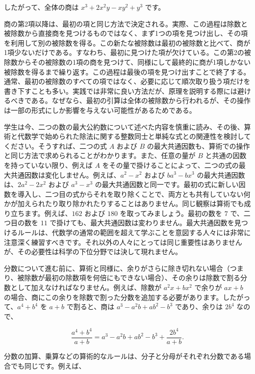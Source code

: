 \documentclass[a4paper,11pt,openany]{ltjsbook}
\begin{document}
したがって、全体の商は \(x^{3} + 2x^{2} y - xy^{2} + y^{3}\) です。

商の第2項以降は、最初の項と同じ方法で決定される。実際、この過程は除数と被除数から直接商を見つけるものではなく、まず1つの項を見つけ出し、その項を利用して別の被除数を得る。この新たな被除数は最初の被除数と比べて、商が1項少ないだけである。すなわち、最初に見つけた項が欠けている。この第2の被除数からその被除数の1項の商を見つけて、同様にして最終的に商が1項しかない被除数を得るまで繰り返す。この過程は最後の項を見つけ出すことで終了する。通常、最初の被除数のすべての項ではなく、必要に応じて順次取り扱う項だけを書き下すことも多い。実践では非常に良い方法だが、原理を説明する際には避けるべきである。なぜなら、最初の引算は全体の被除数から行われるが、その操作は一部の形式にしか影響を与えない可能性があるためである。

学生は今、二つの数の最大公約数について述べた内容を慎重に読み、その後、算術と代数学で始められた除法に関する整数同士と単純な式との関連性を検討してください。そうすれば、二つの式 $A$ および $B$ の最大共通因数も、算術での操作と同じ方法で求められることがわかります。また、任意の量が $B$ と共通の因数を持っていない限り、例えば $A$ をその量で掛けることによって、二つの式の最大共通因数は変化しません。例えば、$a^{2} - x^{2}$ および $ba^{3} - bx^{3}$ の最大共通因数は、$2a^{2} - 2x^{2}$ および $a^{3} - x^{3}$ の最大共通因数と同一です。最初の式に新しい因数を導入し、二つ目の式からそれを取り除くことで、両方とも共有していない何かが加えられたり取り除かれたりすることはありません。同じ観察は算術でも成り立ちます。例えば、$162$ および $180$ を取ってみましょう。最初の数を $7$ で、二つ目の数を $11$ で掛けても、最大共通因数は変わりません。最大共通因数を見つけるルールは、代数学の通常の範囲を超えて学ぶことを意図する人々には非常に注意深く練習すべきです。それ以外の人々にとっては同じ重要性はありませんが、その必要性は科学の下位分野では決して現れません。

分数について進む前に、算術と同様に、余りがさらに除き切れない場合（つまり、被除数が最初の除数項を何倍にもできない場合）、その余りは除数で割る分数として加えなければなりません。例えば、除数が \(a^2x + bx^2\) で余りが \(ax + b\) の場合、商にこの余りを除数で割った分数を追加する必要があります。したがって、\(a^4 + b^4\) を \(a + b\) で割ると、商は \(a^3 - a^2b + ab^2 - b^3\) であり、余りは \(2b^4\) なので、

\[
\frac{a^4 + b^4}{a + b} = a^3 - a^2b + ab^2 - b^3 + \frac{2b^4}{a + b}.
\]

分数の加算、乗算などの算術的なルールは、分子と分母がそれぞれ分数である場合でも同じです。例えば、
\end{document}
